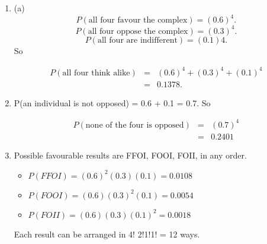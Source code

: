 \documentclass[a4paper,12pt]{article}
\begin{document}
\begin{enumerate}

\item (a)
\[P(\mbox{all four favour the complex}) = (0.6)^4.\]
\[P(\mbox{all four oppose the complex}) = (0.3)^4.\]
\[P(\mbox{all four are indifferent}) = (0.1)4.\]
So 

\begin{eqnarray*}
P(\mbox{all four think alike}) 
&=& (0.6)^4 + (0.3)^4 + (0.1)^4 \\ &=& 0.1378.
\end{eqnarray*}


\item  P(an individual is not opposed) = 0.6 + 0.1 = 0.7.
So 

\begin{eqnarray*}
P(\mbox{none of the four is opposed}) &=& (0.7)^4\\ &=& 0.2401
\end{eqnarray*}


\item  Possible favourable results are FFOI, FOOI, FOII, in any order.
\begin{itemize}
\item $P(FFOI) = (0.6)^2(0.3)(0.1) = 0.0108$
\item $P(FOOI) = (0.6)(0.3)^2(0.1) = 0.0054$
\item $P(FOII) = (0.6)(0.3)(0.1)^2 = 0.0018$
\end{itemize}

Each result can be arranged in 4!
2!1!1!
= 12 ways.


\end{enumerate}
\end{document}

